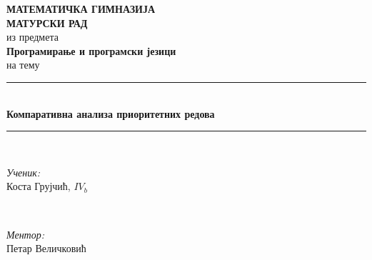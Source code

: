 \documentclass[11pt, a4paper]{article}
\theoremstyle{remark}
\numberwithin{equation}{section}
\begin{document}
	
	\begin{titlepage}
		
		\newcommand{\HRule}{\rule{\linewidth}{0.5mm}} %
		
		\center %
		
		
		\textbf{\LARGE МАТЕМАТИЧКА ГИМНАЗИЈА}\\[5cm] %
		\textbf{\Large МАТУРСКИ РАД}\\[0.3cm] %
		из предмета \\[0.3cm]
		\textbf{\Large Програмирање и програмски језици}\\[.7cm] %
		на тему\\[0.7cm]
		
		
		\HRule \\[0.4cm]
		{ \huge \bfseries Компаративна анализа приоритетних редова}\\[0.4cm] %
		\HRule \\[1.5cm]
		
		
		\begin{minipage}{0.4\textwidth}
			\begin{flushleft} \large
				\emph{Ученик:}\\
				Коста Грујчић, $IV_b$ %
			\end{flushleft}
		\end{minipage}
		~
		\begin{minipage}{0.4\textwidth}
			\begin{flushright} \large
				\emph{Ментор:} \\
				Петар Величковић %
			\end{flushright}
		\end{minipage}\\[10cm]
		

\end{titlepage}
\end{document}
